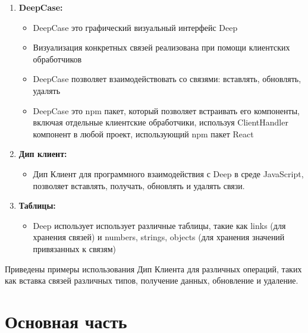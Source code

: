 \documentclass{article}
\begin{document}
\begin{enumerate}
  \item \textbf{DeepCase:}
        \begin{itemize}
          \item DeepCase это графический визуальный интерфейс Deep
          \item Визуализация конкретных связей реализована при помощи клиентских обработчиков
          \item DeepCase позволяет взаимодействовать со связями: вставлять,
                обновлять, удалять
          \item DeepCase это npm пакет, который позволяет встраивать его компоненты, включая отдельные клиентские обработчики, используя ClientHandler компонент в любой проект, использующий npm пакет React
        \end{itemize}

  \item \textbf{Дип клиент:}
        \begin{itemize}
          \item Дип Клиент для программного взаимодействия с Deep в среде
                JavaScript, позволяет вставлять, получать, обновлять и удалять
                связи.
        \end{itemize}

  \item \textbf{Таблицы:}
        \begin{itemize}
          \item Deep использует использует различные таблицы, такие как links (для хранения связей) и numbers, strings, objects (для хранения значений привязанных к связям)
        \end{itemize}
\end{enumerate}

Приведены примеры использования Дип Клиента для различных операций, таких как
вставка связей различных типов, получение данных, обновление и удаление.


\tableofcontents

\section{Основная часть}
\end{document}
